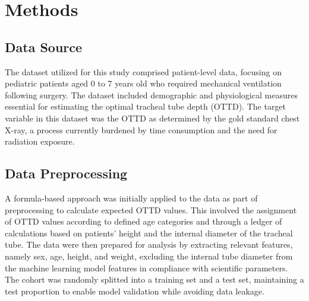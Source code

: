 \documentclass[11pt]{article}
\begin{document}
\section*{Methods}

\subsection*{Data Source}
The dataset utilized for this study comprised patient-level data, focusing on pediatric patients aged 0 to 7 years old who required mechanical ventilation following surgery. The dataset included demographic and physiological measures essential for estimating the optimal tracheal tube depth (OTTD). The target variable in this dataset was the OTTD as determined by the gold standard chest X-ray, a process currently burdened by time consumption and the need for radiation exposure.

\subsection*{Data Preprocessing}
A formula-based approach was initially applied to the data as part of preprocessing to calculate expected OTTD values. This involved the assignment of OTTD values according to defined age categories and through a ledger of calculations based on patients' height and the internal diameter of the tracheal tube. The data were then prepared for analysis by extracting relevant features, namely sex, age, height, and weight, excluding the internal tube diameter from the machine learning model features in compliance with scientific parameters. The cohort was randomly splitted into a training set and a test set, maintaining a test proportion to enable model validation while avoiding data leakage.
\end{document}
